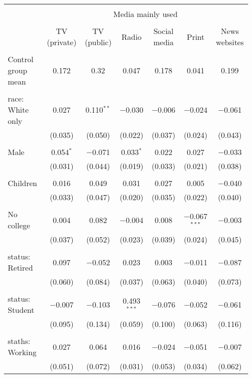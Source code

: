 
\begin{tabular}{@{\extracolsep{5pt}}lcccccc} 
\\[-1.8ex]\hline 
\hline \\[-1.8ex] 
 & \multicolumn{6}{c}{Media mainly used} \\ 
\cline{2-7} 
\\[-1.8ex] & TV (private) & TV (public) & Radio & Social media & Print & News websites \\ 
\hline \\[-1.8ex] 
 Control group mean & 0.172 & 0.32 & 0.047 & 0.178 & 0.041 & 0.199  \\ \hline \\[-1.8ex] race: White only & 0.027 & 0.110$^{**}$ & $-$0.030 & $-$0.006 & $-$0.024 & $-$0.061 \\ 
  & (0.035) & (0.050) & (0.022) & (0.037) & (0.024) & (0.043) \\ 
  & & & & & & \\ 
 Male & 0.054$^{*}$ & $-$0.071 & 0.033$^{*}$ & 0.022 & 0.027 & $-$0.033 \\ 
  & (0.031) & (0.044) & (0.019) & (0.033) & (0.021) & (0.038) \\ 
  & & & & & & \\ 
 Children & 0.016 & 0.049 & 0.031 & 0.027 & 0.005 & $-$0.040 \\ 
  & (0.033) & (0.047) & (0.020) & (0.035) & (0.022) & (0.040) \\ 
  & & & & & & \\ 
 No college & 0.004 & 0.082 & $-$0.004 & 0.008 & $-$0.067$^{***}$ & $-$0.003 \\ 
  & (0.037) & (0.052) & (0.023) & (0.039) & (0.024) & (0.045) \\ 
  & & & & & & \\ 
 status: Retired & 0.097 & $-$0.052 & 0.023 & 0.003 & $-$0.011 & $-$0.087 \\ 
  & (0.060) & (0.084) & (0.037) & (0.063) & (0.040) & (0.073) \\ 
  & & & & & & \\ 
 status: Student & $-$0.007 & $-$0.103 & 0.493$^{***}$ & $-$0.076 & $-$0.052 & $-$0.061 \\ 
  & (0.095) & (0.134) & (0.059) & (0.100) & (0.063) & (0.116) \\ 
  & & & & & & \\ 
 staths: Working & 0.027 & 0.064 & 0.016 & $-$0.024 & $-$0.051 & $-$0.007 \\ 
  & (0.051) & (0.072) & (0.031) & (0.053) & (0.034) & (0.062) \\ 

\end{tabular}

